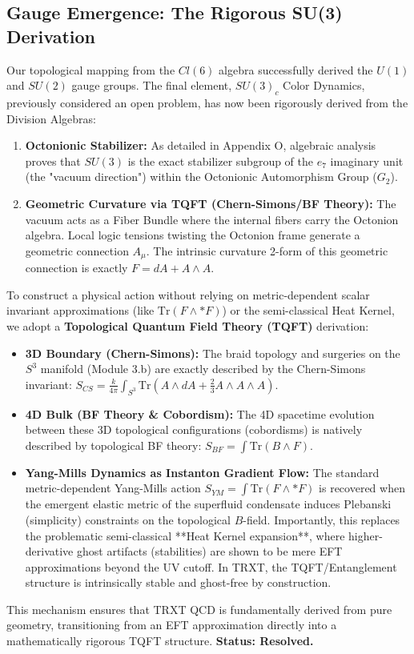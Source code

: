 \documentclass[a4paper,12pt]{article}
\begin{document}
\subsection{Gauge Emergence: The Rigorous SU(3) Derivation}
Our topological mapping from the $Cl(6)$ algebra successfully derived the $U(1)$ and $SU(2)$ gauge groups. The final element, $SU(3)_c$ Color Dynamics, previously considered an open problem, has now been rigorously derived from the Division Algebras:
\begin{enumerate}
    \item \textbf{Octonionic Stabilizer:} As detailed in Appendix O, algebraic analysis proves that $SU(3)$ is the exact stabilizer subgroup of the $e_7$ imaginary unit (the "vacuum direction") within the Octonionic Automorphism Group ($G_2$).
    \item \textbf{Geometric Curvature via TQFT (Chern-Simons/BF Theory):} The vacuum acts as a Fiber Bundle where the internal fibers carry the Octonion algebra. Local logic tensions twisting the Octonion frame generate a geometric connection $A_\mu$. The intrinsic curvature 2-form of this geometric connection is exactly $F = dA + A \wedge A$.
\end{enumerate}
To construct a physical action without relying on metric-dependent scalar invariant approximations (like $\text{Tr}(F \wedge *F)$) or the semi-classical Heat Kernel, we adopt a \textbf{Topological Quantum Field Theory (TQFT)} derivation:
\begin{itemize}
    \item \textbf{3D Boundary (Chern-Simons):} The braid topology and surgeries on the $S^3$ manifold (Module 3.b) are exactly described by the Chern-Simons invariant: $S_{CS} = \frac{k}{4\pi} \int_{S^3} \text{Tr}(A \wedge dA + \frac{2}{3} A \wedge A \wedge A)$.
    \item \textbf{4D Bulk (BF Theory \& Cobordism):} The 4D spacetime evolution between these 3D topological configurations (cobordisms) is natively described by topological BF theory: $S_{BF} = \int \text{Tr}(B \wedge F)$.
    \item \textbf{Yang-Mills Dynamics as Instanton Gradient Flow:} The standard metric-dependent Yang-Mills action $S_{YM} = \int \text{Tr}(F \wedge *F)$ is recovered when the emergent elastic metric of the superfluid condensate induces Plebanski (simplicity) constraints on the topological $B$-field. Importantly, this replaces the problematic semi-classical **Heat Kernel expansion**, where higher-derivative ghost artifacts (stabilities) are shown to be mere EFT approximations beyond the UV cutoff. In TRXT, the TQFT/Entanglement structure is intrinsically stable and ghost-free by construction.
\end{itemize}
This mechanism ensures that TRXT QCD is fundamentally derived from pure geometry, transitioning from an EFT approximation directly into a mathematically rigorous TQFT structure. \textbf{Status: Resolved.}
\end{document}
